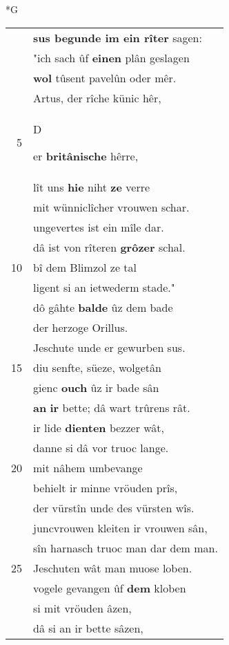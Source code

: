 \documentclass[8pt,a4paper,notitlepage]{article}
\begin{document}
\newpage
\begin{table}[ht]
\begin{minipage}[t]{0.5\linewidth}
\small
\begin{center}*G
\end{center}
\begin{tabular}{rl}
 & \textbf{sus begunde im ein rîter} sagen:\\ 
 & "ich sach ûf \textbf{einen} plân geslagen\\ 
 & \textbf{wol} tûsent pavelûn oder mêr.\\ 
 & Artus, der rîche künic hêr,\\ 
5 & \begin{large}D\end{large}er \textbf{britânische} hêrre,\\ 
 & lît uns \textbf{hie} niht \textbf{ze} verre\\ 
 & mit wünniclîcher vrouwen schar.\\ 
 & ungevertes ist ein mîle dar.\\ 
 & dâ ist von rîteren \textbf{grôzer} schal.\\ 
10 & bî dem Blimzol ze tal\\ 
 & ligent si an ietwederm stade."\\ 
 & dô gâhte \textbf{balde} ûz dem bade\\ 
 & der herzoge Orillus.\\ 
 & Jeschute unde er gewurben sus.\\ 
15 & diu senfte, süeze, wolgetân\\ 
 & gienc \textbf{ouch} ûz ir bade sân\\ 
 & \textbf{an} \textbf{ir} bette; dâ wart trûrens rât.\\ 
 & ir lide \textbf{dienten} bezzer wât,\\ 
 & danne si dâ vor truoc lange.\\ 
20 & mit nâhem umbevange\\ 
 & behielt ir minne vröuden prîs,\\ 
 & der vürstîn unde des vürsten wîs.\\ 
 & juncvrouwen kleiten ir vrouwen sân,\\ 
 & sîn harnasch truoc man dar dem man.\\ 
25 & Jeschuten wât man muose loben.\\ 
 & vogele gevangen ûf \textbf{dem} kloben\\ 
 & si mit vröuden âzen,\\ 
 & dâ si an ir bette sâzen,\\ 

\end{tabular}
\end{minipage}
\end{table}
\end{document}
